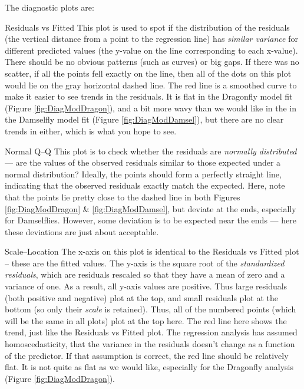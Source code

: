 The diagnostic plots are:
\begin{compactdesc}
		
		\item[Residuals vs Fitted] This plot is used to spot if the 
		distribution of the residuals (the vertical distance from a point 
		to the regression line) has {\it similar variance} for different 
		predicted values (the y-value on the line corresponding to each 
		x-value). There should be no obvious patterns (such as curves) or 
		big gaps. If there was no scatter, if all the points fell exactly 
		on the line, then all of the dots on this plot would lie on the 
		gray horizontal dashed line. The red line is a smoothed curve to 
		make it easier to see trends in the residuals. It is flat in the 
		Dragonfly model fit (Figure \ref{fig:DiagModDragon}), and a bit 
		more wavy than we would like in the in the Damselfly model fit 
		(Figure \ref{fig:DiagModDamsel}), but there are no clear trends in 
		either, which is what you hope to see. 
		
		\item[Normal Q--Q] This plot is to check whether the residuals are 
		{\it normally distributed } --- are the values of the observed 
		residuals similar to those expected under a normal distribution? 
		Ideally, the points should form a perfectly straight line, 
		indicating that the observed residuals exactly match the expected. 
		Here, note that the points lie pretty close to the dashed line in 
		both Figures \ref{fig:DiagModDragon} \& \ref{fig:DiagModDamsel}, 
		but deviate at the ends, especially for Damselflies. However, some 
		deviation is to be expected near the ends --- here these deviations 
		are just about acceptable.

		\item[Scale--Location] The x-axis on this plot is identical to the 
		Residuals vs Fitted plot -- these are the fitted values. The y-axis 
		is the square root of the {\it standardized residuals}, which are 
		residuals rescaled so that they have a mean of zero and a variance 
		of one. As a result, all y-axis values are positive. Thus large 
		residuals (both positive and negative) plot at the top, and small 
		residuals plot at the bottom (so only their {\it scale} is 
		retained). Thus, all of the numbered points (which will be the same 
		in all plots) plot at the top here. The red line here shows the 
		trend, just like the Residuals vs Fitted plot. The regression 
		analysis has assumed homoscedasticity, that the variance in the 
		residuals doesn't change as a function of the predictor. If that 
		assumption is correct, the red line should be relatively flat. It 
		is not quite as flat as we would like, especially for the Dragonfly 
		analysis (Figure \ref{fig:DiagModDragon}).
		

\end{compactdesc}
